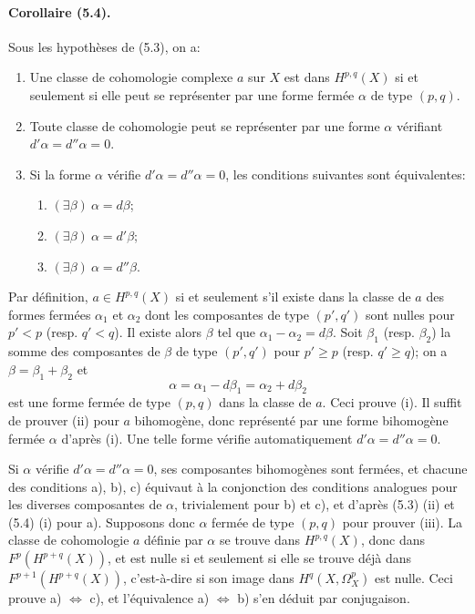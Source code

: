 \documentclass[10pt]{article}
\begin{document}
\paragraph{Corollaire (5.4).} Sous les hypothèses de (5.3), on a:
\begin{enumerate}[label=(\roman*)]
\item Une classe de cohomologie complexe $a$ sur $X$ est dans $H^{p,q}(X)$ si et seulement si elle peut se représenter par une forme fermée $\alpha$ de type $(p,q)$.
\item Toute classe de cohomologie peut se représenter par une forme $\alpha$ vérifiant $d'\alpha=d''\alpha=0$.
\item Si la forme $\alpha$ vérifie $d'\alpha=d''\alpha=0$, les conditions suivantes sont équivalentes:
\begin{enumerate}[label=\alph*)]
\item $(\exists\beta)\ \alpha=d\beta$;
\item $(\exists\beta)\ \alpha=d'\beta$;
\item $(\exists\beta)\ \alpha=d''\beta$.
\end{enumerate}
\end{enumerate}
Par définition, $a\in H^{p,q}(X)$ si et seulement s'il existe dans la classe de $a$ des formes fermées $\alpha_1$ et $\alpha_2$ dont les composantes de type $(p',q')$ sont nulles pour $p'<p$ (resp. $q'<q$). Il existe alors $\beta$ tel que $\alpha_1-\alpha_2=d\beta$. Soit $\beta_1$ (resp. $\beta_2$) la somme des composantes de $\beta$ de type $(p',q')$ pour $p'\ge p$ (resp. $q'\ge q$); on a $\beta=\beta_1+\beta_2$ et
\[
\alpha=\alpha_1-d\beta_1=\alpha_2+d\beta_2
\]
est une forme fermée de type $(p,q)$ dans la classe de $a$. Ceci prouve (i). Il suffit de prouver (ii) pour $a$ bihomogène, donc représenté par une forme bihomogène fermée $\alpha$ d'après (i). Une telle forme vérifie automatiquement $d'\alpha=d''\alpha=0$.

Si $\alpha$ vérifie $d'\alpha=d''\alpha=0$, ses composantes bihomogènes sont fermées, et chacune des conditions a), b), c) équivaut à la conjonction des conditions analogues pour les diverses composantes de $\alpha$, trivialement pour b) et c), et d'après (5.3) (ii) et (5.4) (i) pour a). Supposons donc $\alpha$ fermée de type $(p,q)$ pour prouver (iii). La classe de cohomologie $a$ définie par $\alpha$ se trouve dans $H^{p,q}(X)$, donc dans $F^p(H^{p+q}(X))$, et est nulle si et seulement si elle se trouve déjà dans $F^{p+1}(H^{p+q}(X))$, c'est-à-dire si son image dans $H^q(X,\Omega_X^p)$ est nulle. Ceci prouve a) $\Leftrightarrow$ c), et l'équivalence a) $\Leftrightarrow$ b) s'en déduit par conjugaison.
\end{document}
